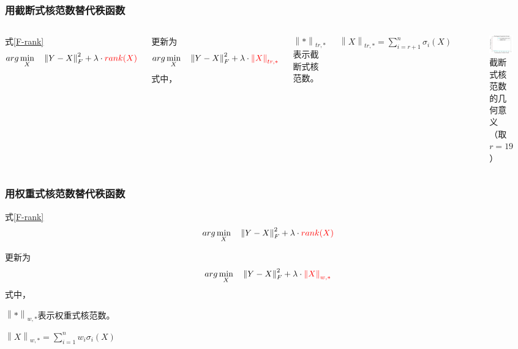 \documentclass[10pt,aspectratio=43,mathserif]{beamer}
\begin{document}
\begin{frame}
\frametitle{\textbf{用截断式核范数替代秩函数}}
\begin{columns}
\par 式\ref{F-rank}
\begin{displaymath}
	arg\min\limits_{X} \quad \left\|Y-X\right\|_F^2 + \lambda \cdot {\color{red}{rank(X)}}
\end{displaymath}
\par 更新为
\begin{equation}
	\centering
	arg\min\limits_{X} \quad \left\|Y-X\right\|_F^2 + \lambda \cdot {\color{red}{\left\|X\right\|_{tr,*}}}
	\label{F-TNN}
\end{equation}
式中，
\par $\left\|*\right\|_{tr,*}$表示截断式核范数。
\par $\left\|X\right\|_{tr,*} = \sum\limits_{i=r+1}^{n}\sigma_i(X)$

\begin{figure}[!t]
\centering
\includegraphics[scale=0.3]{surrogate-to-rank-2.png}
\caption{截断式核范数的几何意义（取$r=19$）}
\label{surrogate-to-rank-2}
\end{figure}
\end{columns}
\end{frame}

\begin{frame}
\frametitle{\textbf{用权重式核范数替代秩函数}}
\par 式\ref{F-rank}
\begin{displaymath}
arg\min\limits_{X} \quad \left\|Y-X\right\|_F^2 + \lambda \cdot {\color{red}{rank(X)}}
\end{displaymath}
\par 更新为
\begin{equation}
\centering
arg\min\limits_{X} \quad \left\|Y-X\right\|_F^2 + \lambda \cdot {\color{red}{\left\|X\right\|_{w,*}}}
\label{F-WNN}
\end{equation}
式中，
\par $\left\|*\right\|_{w,*}$表示权重式核范数。
\par $\left\|X\right\|_{w,*} = \sum\limits_{i=1}^{n}w_i\sigma_i(X)$
	
\end{frame}
\end{document}
